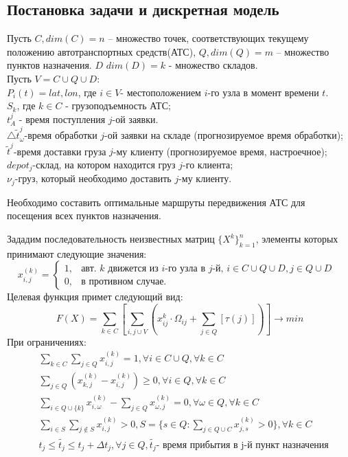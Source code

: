 \documentclass[]{TAACpaper}
\begin{document}
\subsection{Постановка задачи и дискретная модель}
Пусть $C,dim(C)=n$ – множество точек, соответствующих текущему положению автотранспортных средств(АТС), $Q,dim(Q)=m$ – множество пунктов назначения. $D$ $dim(D)=k$ - множество складов.\\
Пусть $V=C\cup{Q}\cup{D}$:\\
$P_i(t)={lat,lon}$, где $i\in{V}$- местоположением $i$-го узла в момент времени $t$.\\
$S_k$, где $k\in{C}$ - грузоподъемность АТС;\\
$t_{A}^{j}$ - время поступления $j$-ой заявки.\\
$\bigtriangleup\tilde{t}_{\omega}^{j}$-время обработки $j$-ой заявки на складе (прогнозируемое время обработки);\\
$\tilde{t}^{j}$-время доставки груза $j$-му клиенту (прогнозируемое время, настроечное);\\
$depot_j$-склад, на котором находится груз $j$-го клиента;\\
$\nu_j$-груз, который необходимо доставить $j$-му клиенту.

Необходимо составить оптимальные маршруты передвижения АТС для посещения всех пунктов назначения.

Зададим последовательность неизвестных матриц $\{X^k\}^n_{k=1}$, элементы  которых принимают следующие значения:
\begin{equation}
  x^{(k)}_{i,j} = 
    \begin{cases}
	  1,&\text{авт. $k$ движется из $i$-го узла в $j$-й, 
	           $i\in{C}\cup{Q}\cup{D}, j \in Q\cup{D}$ }\\
	  0,&\text{в противном случае.}
    \end{cases}
\end{equation}
Целевая функция примет следующий вид:
\begin{equation} \label{main_objective}
  F(X) = 
    \sum_{k \in C}[
     \sum_{i,j\cup{V}} 
     (x_{ij}^{k}\cdot\Omega_{ij}+\sum_{j\in{Q}}[\tau(j)])
     ]
     \to min
\end{equation}
При ограничениях:
\begin{align} 
& \sum_{k \in C}\sum_{j \in Q}x^{(k)}_{i,j} = 1, 
  \forall i \in C \cup Q, \forall k \in C \label{main_cond_1}\\ 
& \sum_{j \in Q} ( 
       x^{(k)}_{k,j} -x^{(k)}_{i,j} ) \geq 0, 
       \forall i \in Q ,  \forall k \in C \label{main_cond_2}\\
& \sum_{i \in Q \cup  \{k\}} x^{(k)}_{i,\omega} - 
  \sum_{j \in Q} x^{(k)}_{\omega,j} = 0, 
  \forall \omega \in Q ,  \forall k \in C \label{main_cond_3}\\
&  \sum_{i \in S}\sum_{j \notin S}x^{(k)}_{i,j} > 0, 
  S=\{s \in Q: \sum_{j \in Q \cup C}x^{(k)}_{j,s}>0 \}  ,\forall k \in C \label{main_cond_4}\\
& t_j \leq \tilde{t_j} \leq t_j + \Delta t_j, \forall j \in Q, 
\tilde{t_j} \text {- время прибытия в j-й пункт назначения} \label{main_cond_5}
\end{align}
\end{document}
